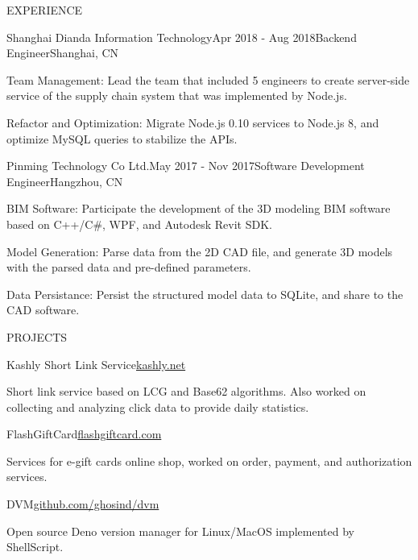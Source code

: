 \documentclass{resume} %
\begin{document}
\begin{rSection}{EXPERIENCE}
  \begin{rSubsection}{Shanghai Dianda Information Technology}{Apr 2018 - Aug 2018}{Backend Engineer}{Shanghai, CN}
    \item Team Management: Lead the team that included 5 engineers to create server-side service of the supply chain system that was implemented by Node.js.
    \item Refactor and Optimization: Migrate Node.js 0.10 services to Node.js 8, and optimize MySQL queries to stabilize the APIs.
  \end{rSubsection}

  \begin{rSubsection}{Pinming Technology Co Ltd.}{May 2017 - Nov 2017}{Software Development Engineer}{Hangzhou, CN}
    \item BIM Software: Participate the development of the 3D modeling BIM software based on C++/C\#, WPF, and Autodesk Revit SDK.
    \item Model Generation: Parse data from the 2D CAD file, and generate 3D models with the parsed data and pre-defined parameters.
    \item Data Persistance: Persist the structured model data to SQLite, and share to the CAD software.
  \end{rSubsection}

\end{rSection}


\begin{rSection}{PROJECTS}

\begin{rSubsection}{Kashly Short Link Service}{\href{https://kashly.net}{kashly.net}}{}{}
  \item Short link service based on LCG and Base62 algorithms. Also worked on collecting and analyzing click data to provide daily statistics.
\end{rSubsection}

\begin{rSubsection}{FlashGiftCard}{\href{https://flashgiftcard.com}{flashgiftcard.com}}{}{}
  \item Services for e-gift cards online shop, worked on order, payment, and authorization services.
\end{rSubsection}

\begin{rSubsection}{DVM}{\href{https://github.com/ghosind/dvm}{github.com/ghosind/dvm}}{}{}
  \item Open source Deno version manager for Linux/MacOS implemented by ShellScript.
\end{rSubsection}

\end{rSection}
\end{document}
